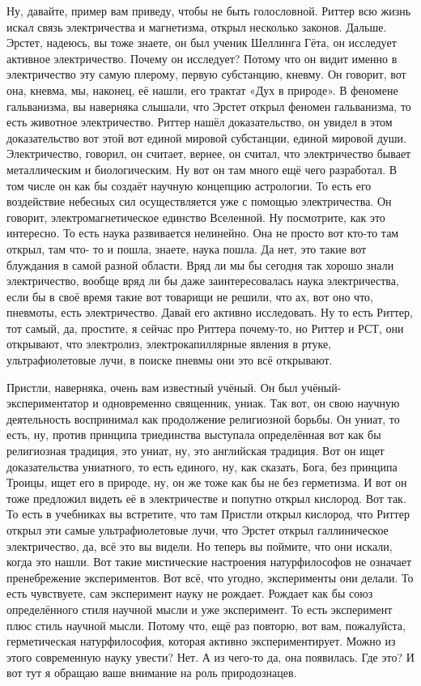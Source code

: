 Ну, давайте, пример вам приведу, чтобы не быть голословной.
Риттер всю жизнь искал связь электричества и магнетизма, открыл несколько
законов. Дальше. Эрстет, надеюсь, вы тоже знаете, он был ученик Шеллинга Гёта,
он исследует активное электричество. Почему он исследует? Потому что он видит
именно в электричество эту самую плерому, первую субстанцию, кневму. Он говорит,
вот она, кневма, мы, наконец, её нашли, его трактат «Дух в природе». В феномене
гальванизма, вы наверняка слышали, что Эрстет открыл феномен гальванизма, то
есть животное электричество. Риттер нашёл доказательство, он увидел в этом
доказательство вот этой вот единой мировой субстанции, единой мировой души.
Электричество, говорил, он считает, вернее, он считал, что электричество бывает
металлическим и биологическим. Ну вот он там много ещё чего разработал. В том
числе он как бы создаёт научную концепцию астрологии. То есть его воздействие
небесных сил осуществляется уже с помощью электричества. Он говорит,
электромагнетическое единство Вселенной. Ну посмотрите, как это интересно. То
есть наука развивается нелинейно. Она не просто вот кто-то там открыл, там что-
то и пошла, знаете, наука пошла. Да нет, это такие вот блуждания в самой разной
области. Вряд ли мы бы сегодня так хорошо знали электричество, вообще вряд ли бы
даже заинтересовалась наука электричества, если бы в своё время такие вот
товарищи не решили, что ах, вот оно что, пневмоты, есть электричество. Давай его
активно исследовать. Ну то есть Риттер, тот самый, да, простите, я сейчас про
Риттера почему-то, но Риттер и РСТ, они открывают, что электролиз,
электрокапиллярные явления в ртуке, ультрафиолетовые лучи, в поиске пневмы они
это всё открывают. 

Пристли, наверняка, очень вам известный учёный. Он был
учёный-экспериментатор и одновременно священник, униак. Так вот, он свою научную
деятельность воспринимал как продолжение религиозной борьбы. Он униат, то есть,
ну, против принципа триединства выступала определённая вот как бы религиозная
традиция, это униат, ну, это английская традиция. Вот он ищет доказательства
униатного, то есть единого, ну, как сказать, Бога, без принципа Троицы, ищет его
в природе, ну, он же тоже как бы не без герметизма. И вот он тоже предложил
видеть её в электричестве и попутно открыл кислород. Вот так. То есть в
учебниках вы встретите, что там Пристли открыл кислород, что Риттер открыл эти
самые ультрафиолетовые лучи, что Эрстет открыл галлиническое электричество, да,
всё это вы видели. Но теперь вы поймите, что они искали, когда это нашли. Вот
такие мистические настроения натурфилософов не означает пренебрежение
экспериментов. Вот всё, что угодно, эксперименты они делали. То есть чувствуете,
сам эксперимент науку не рождает. Рождает как бы союз определённого стиля
научной мысли и уже эксперимент. То есть эксперимент плюс стиль научной мысли.
Потому что, ещё раз повторю, вот вам, пожалуйста, герметическая натурфилософия,
которая активно экспериментирует. Можно из этого современную науку увести? Нет.
А из чего-то да, она появилась. Где это? И вот тут я обращаю ваше внимание на
роль природознацев. 

